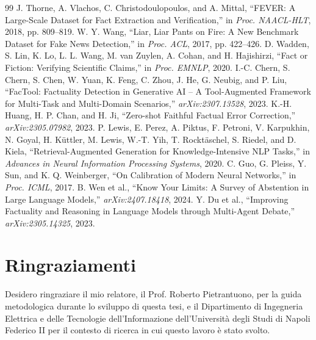 \documentclass[12pt,a4paper,openany]{report}
\begin{document}
\begin{thebibliography}{99}
 J. Thorne, A. Vlachos, C. Christodoulopoulos, and A. Mittal, ``FEVER: A Large-Scale Dataset for Fact Extraction and Verification,'' in \emph{Proc. NAACL-HLT}, 2018, pp. 809--819.
 W. Y. Wang, ``Liar, Liar Pants on Fire: A New Benchmark Dataset for Fake News Detection,'' in \emph{Proc. ACL}, 2017, pp. 422--426.
 D. Wadden, S. Lin, K. Lo, L. L. Wang, M. van Zuylen, A. Cohan, and H. Hajishirzi, ``Fact or Fiction: Verifying Scientific Claims,'' in \emph{Proc. EMNLP}, 2020.
 I.-C. Chern, S. Chern, S. Chen, W. Yuan, K. Feng, C. Zhou, J. He, G. Neubig, and P. Liu, ``FacTool: Factuality Detection in Generative AI -- A Tool-Augmented Framework for Multi-Task and Multi-Domain Scenarios,'' \emph{arXiv:2307.13528}, 2023.
 K.-H. Huang, H. P. Chan, and H. Ji, ``Zero-shot Faithful Factual Error Correction,'' \emph{arXiv:2305.07982}, 2023.
 P. Lewis, E. Perez, A. Piktus, F. Petroni, V. Karpukhin, N. Goyal, H. Küttler, M. Lewis, W.-T. Yih, T. Rocktäschel, S. Riedel, and D. Kiela, ``Retrieval-Augmented Generation for Knowledge-Intensive NLP Tasks,'' in \emph{Advances in Neural Information Processing Systems}, 2020.
 C. Guo, G. Pleiss, Y. Sun, and K. Q. Weinberger, ``On Calibration of Modern Neural Networks,'' in \emph{Proc. ICML}, 2017.
 B. Wen et al., ``Know Your Limits: A Survey of Abstention in Large Language Models,'' \emph{arXiv:2407.18418}, 2024.
 Y. Du et al., ``Improving Factuality and Reasoning in Language Models through Multi-Agent Debate,'' \emph{arXiv:2305.14325}, 2023.
\end{thebibliography}

\chapter*{Ringraziamenti}
Desidero ringraziare il mio relatore, il Prof. Roberto Pietrantuono, per la guida metodologica durante lo sviluppo di questa tesi, e il Dipartimento di Ingegneria Elettrica e delle Tecnologie dell'Informazione dell'Universit\`a degli Studi di Napoli Federico II per il contesto di ricerca in cui questo lavoro \`e stato svolto.
\end{document}
